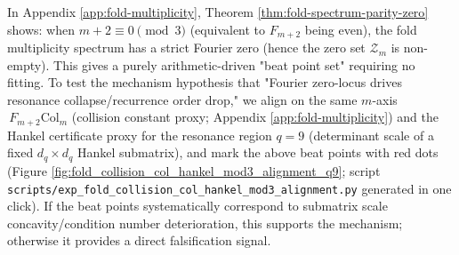 \begin{remark}[Arithmetic beat marking: \texorpdfstring{$m+2\equiv 0\pmod 3$}{m+2=0 mod 3} points and Hankel certificate alignment (falsifiable)]\label{rem:pom-mod3-beat-alignment}
In Appendix \ref{app:fold-multiplicity}, Theorem \ref{thm:fold-spectrum-parity-zero} shows: when \(m+2\equiv 0\pmod 3\) (equivalent to \(F_{m+2}\) being even), the fold multiplicity spectrum has a strict Fourier zero (hence the zero set \(\mathcal{Z}_m\) is non-empty).
This gives a purely arithmetic-driven "beat point set" requiring no fitting.
To test the mechanism hypothesis that "Fourier zero-locus drives resonance collapse/recurrence order drop," we align on the same \(m\)-axis
\(\,F_{m+2}\mathrm{Col}_m\) (collision constant proxy; Appendix \ref{app:fold-multiplicity}) and
the Hankel certificate proxy for the resonance region \(q=9\) (determinant scale of a fixed \(d_q\times d_q\) Hankel submatrix), and mark the above beat points with red dots (Figure \ref{fig:fold_collision_col_hankel_mod3_alignment_q9}; script \texttt{scripts/exp\_fold\_collision\_col\_hankel\_mod3\_alignment.py} generated in one click).
If the beat points systematically correspond to submatrix scale concavity/condition number deterioration, this supports the mechanism; otherwise it provides a direct falsification signal.
\end{remark}



